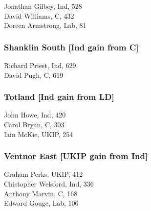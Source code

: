\documentclass[a4paper,openany,10pt]{book}
\begin{document}


Jonathan Gilbey, Ind, 528\\
David Williams, C, 432\\
Doreen Armstrong, Lab, 81\\


\subsubsection*{Shanklin South \hspace*{\fill}\nolinebreak[1]%
\enspace\hspace*{\fill}
[Ind gain from C]}



Richard Priest, Ind, 629\\
David Pugh, C, 619\\


\subsubsection*{Totland \hspace*{\fill}\nolinebreak[1]%
\enspace\hspace*{\fill}
[Ind gain from LD]}



John Howe, Ind, 420\\
Carol Bryan, C, 303\\
Iain McKie, UKIP, 254\\


\subsubsection*{Ventnor East \hspace*{\fill}\nolinebreak[1]%
\enspace\hspace*{\fill}
[UKIP gain from Ind]}



Graham Perks, UKIP, 412\\
Chistopher Welsford, Ind, 336\\
Anthony Marvin, C, 168\\
Edward Gouge, Lab, 106\\
\end{document}
